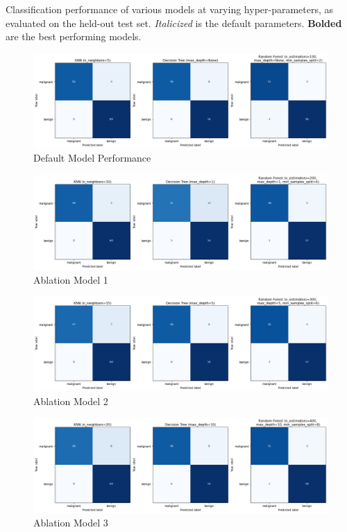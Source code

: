 \documentclass[letterpaper]{article}
\begin{document}
\begin{table}[htbp]
		\caption{Classification performance of various models at varying hyper-parameters, as evaluated on the held-out test set. \textit{Italicized} is the default parameters. \textbf{Bolded} are the best performing models.}
		\label{tab:model_performance}
	\end{table}
	
	\begin{figure}[H]
		\centering
		\includegraphics[width=1\linewidth]{figures/1}
		\caption{Default Model Performance}
		\label{fig:1}
	\end{figure}
	
	\begin{figure}[H]
		\centering
		\includegraphics[width=1\linewidth]{figures/2}
		\caption{Ablation Model 1}
		\label{fig:2}
	\end{figure}
	
	\begin{figure}[H]
		\centering
		\includegraphics[width=1\linewidth]{figures/3}
		\caption{Ablation Model 2}
		\label{fig:3}
	\end{figure}
		
	\begin{figure}[H]
		\centering
		\includegraphics[width=1\linewidth]{figures/4}
		\caption{Ablation Model 3}
		\label{fig:4}
	\end{figure}
		
\end{document}

